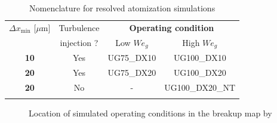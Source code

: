 \clearpage



\begin{table}[!h]
\centering
\caption{Nomenclature for resolved atomization simulations}
\begin{tabular}{cccc}
\thickhline
$\Delta x_\mathrm{min}$ [$\mu$m]  & Turbulence & \multicolumn{2}{c}{\textbf{Operating condition}} \\ 
\cline{3-4}
 & injection ? & Low $We_g$ &  High $We_g$ \\ 
\thickhline
\textbf{10} & Yes & UG75\_DX10 & UG100\_DX10 \\
\textbf{20} & Yes & UG75\_DX20 & UG100\_DX20 \\
\textbf{20} & No & - & UG100\_DX20\_NT \\
\thickhline
\end{tabular}
\label{tab:jicf_resolved_simulations_performed}
\end{table}

\begin{figure}[ht]
     \centering
     \caption{Location of simulated operating conditions in the breakup map by \citeColor[wu_breakup_1997]}
      \label{fig:location_JICF_ops_in_breakup_map}
\end{figure}




